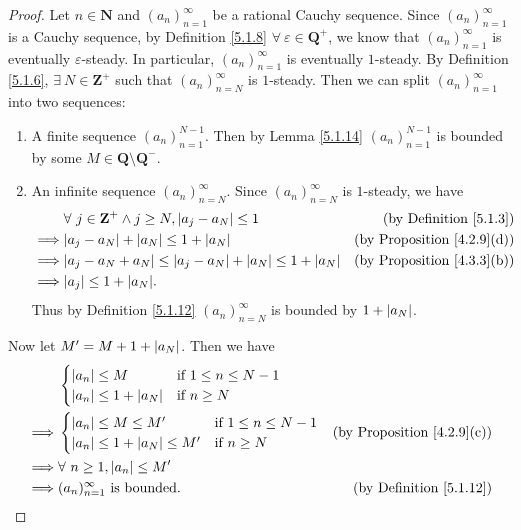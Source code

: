 \begin{proof}
    Let \(n \in \mathbf{N}\) and \((a_n)_{n = 1}^{\infty}\) be a rational Cauchy sequence.
    Since \((a_n)_{n = 1}^{\infty}\) is a Cauchy sequence, by Definition \ref{5.1.8} \(\forall\ \varepsilon \in \mathbf{Q}^+\), we know that \((a_n)_{n = 1}^{\infty}\) is eventually \(\varepsilon\)-steady.
    In particular, \((a_n)_{n = 1}^{\infty}\) is eventually \(1\)-steady.
    By Definition \ref{5.1.6}, \(\exists\ N \in \mathbf{Z}^+\) such that \((a_n)_{n = N}^{\infty}\) is \(1\)-steady.
    Then we can split \((a_n)_{n = 1}^{\infty}\) into two sequences:
    \begin{enumerate}
        \item A finite sequence \((a_n)_{n = 1}^{N - 1}\).
              Then by Lemma \ref{5.1.14} \((a_n)_{n = 1}^{N - 1}\) is bounded by some \(M \in \mathbf{Q} \setminus \mathbf{Q}^-\).
        \item An infinite sequence \((a_n)_{n = N}^{\infty}\).
              Since \((a_n)_{n = N}^\infty\) is \(1\)-steady, we have
              \begin{align*}
                           & \forall\ j \in \mathbf{Z}^+ \land j \geq N, \abs*{a_j - a_N} \leq 1           & \text{(by Definition \ref{5.1.3})}     \\
                  \implies & \abs*{a_j - a_N} + \abs*{a_N} \leq 1 + \abs*{a_N}                             & \text{(by Proposition \ref{4.2.9}(d))} \\
                  \implies & \abs*{a_j - a_N + a_N} \leq \abs*{a_j - a_N} + \abs*{a_N} \leq 1 + \abs*{a_N} & \text{(by Proposition \ref{4.3.3}(b))} \\
                  \implies & \abs*{a_j} \leq 1 + \abs*{a_N}.
              \end{align*}
              Thus by Definition \ref{5.1.12} \((a_n)_{n = N}^\infty\) is bounded by \(1 + \abs*{a_N}\).
    \end{enumerate}
    Now let \(M' = M + 1 + \abs*{a_N}\).
    Then we have
    \begin{align*}
                 & \begin{cases}
            \abs*{a_n} \leq M              & \text{if } 1 \leq n \leq N - 1 \\
            \abs*{a_n} \leq 1 + \abs*{a_N} & \text{if } n \geq N
        \end{cases}                                                        \\
        \implies & \begin{cases}
            \abs*{a_n} \leq M \leq M'              & \text{if } 1 \leq n \leq N - 1 \\
            \abs*{a_n} \leq 1 + \abs*{a_N} \leq M' & \text{if } n \geq N
        \end{cases}               & \text{(by Proposition \ref{4.2.9}(c))} \\
        \implies & \forall\ n \geq 1, \abs*{a_n} \leq M'                                             \\
        \implies & (a_n)_{n = 1}^\infty \text{ is bounded}. & \text{(by Definition \ref{5.1.12})}
    \end{align*}
\end{proof}


